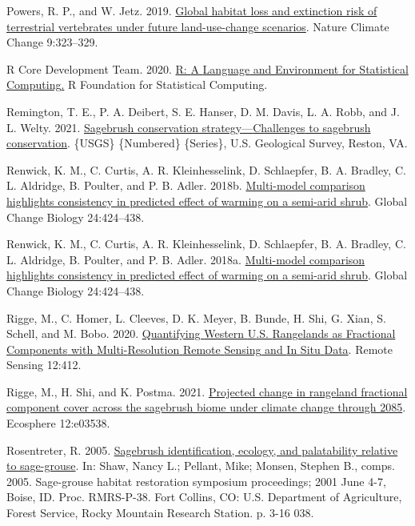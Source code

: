 \documentclass[
  12pt,
]{article}
\newlength{\cslhangindent}
\newlength{\cslentryspacingunit} %
\newenvironment{CSLReferences}[2] %
 {%
  \setlength{\parindent}{0pt}
  \ifodd #1
  \let\oldpar\par
  \def\par{\hangindent=\cslhangindent\oldpar}
  \fi
  \setlength{\parskip}{#2\cslentryspacingunit}
 }%
 {}
\begin{document}
\begin{CSLReferences}{1}{0}
\leavevmode{}%
Powers, R. P., and W. Jetz. 2019. \href{https://doi.org/10.1038/s41558-019-0406-z}{Global habitat loss and extinction risk of terrestrial vertebrates under future land-use-change scenarios}. Nature Climate Change 9:323--329.

\leavevmode{}%
R Core Development Team. 2020. \href{https://www.R-project.org/}{R: {A} {Language} and {Environment} for {Statistical} {Computing}.} R Foundation for Statistical Computing.

\leavevmode{}%
Remington, T. E., P. A. Deibert, S. E. Hanser, D. M. Davis, L. A. Robb, and J. L. Welty. 2021. \href{https://doi.org/10.3133/ofr20201125}{Sagebrush conservation strategy---{Challenges} to sagebrush conservation}. \{USGS\} \{Numbered\} \{Series\}, U.S. Geological Survey, Reston, VA.

\leavevmode{}%
Renwick, K. M., C. Curtis, A. R. Kleinhesselink, D. Schlaepfer, B. A. Bradley, C. L. Aldridge, B. Poulter, and P. B. Adler. 2018b. \href{https://doi.org/10.1111/gcb.13900}{Multi-model comparison highlights consistency in predicted effect of warming on a semi-arid shrub}. Global Change Biology 24:424--438.

\leavevmode{}%
Renwick, K. M., C. Curtis, A. R. Kleinhesselink, D. Schlaepfer, B. A. Bradley, C. L. Aldridge, B. Poulter, and P. B. Adler. 2018a. \href{https://doi.org/10.1111/gcb.13900}{Multi-model comparison highlights consistency in predicted effect of warming on a semi-arid shrub}. Global Change Biology 24:424--438.

\leavevmode{}%
Rigge, M., C. Homer, L. Cleeves, D. K. Meyer, B. Bunde, H. Shi, G. Xian, S. Schell, and M. Bobo. 2020. \href{https://doi.org/10.3390/rs12030412}{Quantifying {Western} {U}.{S}. {Rangelands} as {Fractional} {Components} with {Multi}-{Resolution} {Remote} {Sensing} and {In} {Situ} {Data}}. Remote Sensing 12:412.

\leavevmode{}%
Rigge, M., H. Shi, and K. Postma. 2021. \href{https://doi.org/10.1002/ecs2.3538}{Projected change in rangeland fractional component cover across the sagebrush biome under climate change through 2085}. Ecosphere 12:e03538.

\leavevmode{}%
Rosentreter, R. 2005. \href{https://www.fs.usda.gov/treesearch/pubs/21434}{Sagebrush identification, ecology, and palatability relative to sage-grouse}. In: Shaw, Nancy L.; Pellant, Mike; Monsen, Stephen B., comps. 2005. Sage-grouse habitat restoration symposium proceedings; 2001 June 4-7, Boise, ID. Proc. RMRS-P-38. Fort Collins, CO: U.S. Department of Agriculture, Forest Service, Rocky Mountain Research Station. p. 3-16 038.


\end{CSLReferences}
\end{document}
